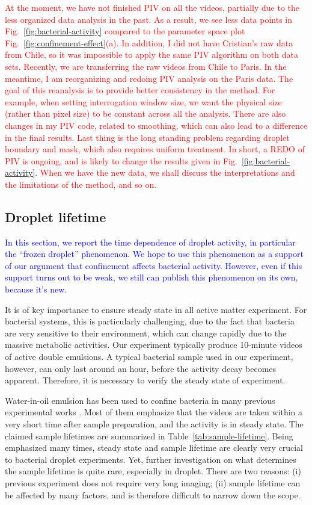 \documentclass[%
10pt,
superscriptaddress,
twocolumn,
 amsmath,amssymb,
 aps,prx,
]{revtex4-2}
\begin{document}
\textcolor{red}{
At the moment, we have not finished PIV on all the videos, partially due to the less organized data analysis in the past.
As a result, we see less data points in Fig.~\ref{fig:bacterial-activity} compared to the parameter space plot Fig.~\ref{fig:confinement-effect}(a).
In addition, I did not have Cristian's raw data from Chile, so it was impossible to apply the same PIV algorithm on both data sets.
Recently, we are transferring the raw videos from Chile to Paris.
In the meantime, I am reorganizing and redoing PIV analysis on the Paris data.
The goal of this reanalysis is to provide better consistency in the method.
For example, when setting interrogation window size, we want the physical size (rather than pixel size) to be constant across all the analysis.
There are also changes in my PIV code, related to smoothing, which can also lead to a difference in the final results.
Last thing is the long standing problem regarding droplet boundary and mask, which also requires uniform treatment.
In short, a REDO of PIV is ongoing, and is likely to change the results given in Fig.~\ref{fig:bacterial-activity}.
When we have the new data, we shall discuss the interpretations and the limitations of the method, and so on.
}
\subsection{Droplet lifetime}
\textcolor{blue}{
In this section, we report the time dependence of droplet activity, in particular the ``frozen droplet'' phenomenon.
We hope to use this phenomenon as a support of our argument that confinement affects bacterial activity.
However, even if this support turns out to be weak, we still can publish this phenomenon on its own, because it's new.
}

It is of key importance to ensure steady state in all active matter experiment.
For bacterial systems, this is particularly challenging, due to the fact that bacteria are very sensitive to their environment, which can change rapidly due to the massive metabolic activities. 
Our experiment typically produce 10-minute videos of active double emulsions. 
A typical bacterial sample used in our experiment, however, can only last around an hour, before the activity decay becomes apparent. 
Therefore, it is necessary to verify the steady state of experiment. 

Water-in-oil emulsion has been used to confine bacteria in many previous experimental works \cite{Hamby2018, Lushi2014, Rajabi2021, Ramos2020, Vincenti2019, Wioland2013}. 
Most of them emphasize that the videos are taken within a very short time after sample preparation, and the activity is in steady state. 
The claimed sample lifetimes are summarized in Table~\ref{tab:sample-lifetime}. Being emphasized many times, steady state and sample lifetime are clearly very crucial to bacterial droplet experiments. 
Yet, further investigation on what determines the sample lifetime is quite rare, especially in droplet. 
There are two reasons: (i) previous experiment does not require very long imaging; (ii) sample lifetime can be affected by many factors, and is therefore difficult to narrow down the scope.
\end{document}
